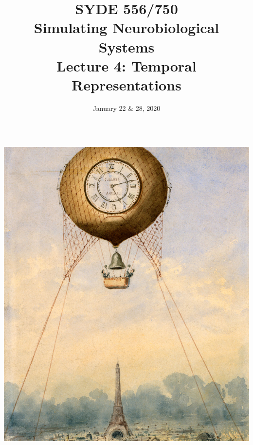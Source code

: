 \documentclass[handout,aspectratio=169]{beamer}
\date{January 22 \& 28, 2020}
\title{SYDE 556/750 \\ Simulating Neurobiological Systems \\ Lecture 4: Temporal Representations}
\begin{document}
\begin{frame}{}
	\vspace{0.5cm}
	\begin{columns}[c]
		\MakeTitle
		\includegraphics[width=\textwidth]{media/camille_gravis_captive_balloon_with_clock_face_small.jpg}
	\end{columns}
\end{frame}
\end{document}
